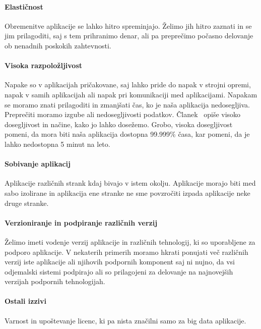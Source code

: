 \paragraph{Elastičnost}
Obremenitve aplikacije se lahko hitro spreminjajo.
Želimo jih hitro zaznati in se jim prilagoditi, saj s tem prihranimo denar, ali pa preprečimo počasno delovanje
ob nenadnih poskokih zahtevnosti.

\paragraph{Visoka razpoložljivost}\label{par:high_availability}
Napake so v aplikacijah pričakovane, saj lahko pride do napak v strojni opremi, napak v samih aplikacijah ali
napak pri komunikaciji med aplikacijami.
Napakam se moramo znati prilagoditi in zmanjšati čas, ko je naša aplikacija nedosegljiva.
Preprečiti moramo izgube ali nedosegljivosti podatkov.
Članek~\cite{ha_computer_systems} opiše visoko dosegljivost in načine, kako jo lahko dosežemo.
Grobo, visoka dosegljivost pomeni, da mora biti naša aplikacija dostopna 99.999\% časa, kar pomeni, da je lahko
nedostopna 5 minut na leto.

\paragraph{Sobivanje aplikacij}
Aplikacije različnih strank kdaj bivajo v istem okolju.
Aplikacije morajo biti med sabo izolirane in aplikacija ene stranke ne sme povzročiti izpada aplikacije 
neke druge stranke.

\paragraph{Verzioniranje in podpiranje različnih verzij}
Želimo imeti vodenje verzij aplikacije in različnih tehnologij, ki so uporabljene za podporo aplikacije.
V nekaterih primerih moramo hkrati ponujati več različnih verzij iste aplikacije 
ali njihovih podpornih komponent saj ni nujno, da vsi odjemalski sistemi podpirajo 
ali so prilagojeni za delovanje na najnovejših verzijah podpornih tehnologijah.

\paragraph{Ostali izzivi}
Varnost in upoštevanje licenc, ki pa nista značilni samo za big data aplikacije.



